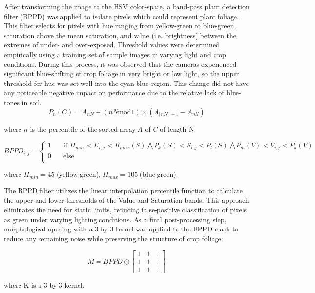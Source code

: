 \documentclass[authoryear]{elsarticle}
\begin{document}
After transforming the image to the HSV color-space, a band-pass plant
detection filter (BPPD) was applied to isolate pixels which could
represent plant foliage. This filter selects for pixels with hue
ranging from yellow-green to blue-green, saturation above the mean
saturation, and value (i.e. brightness) between the extremes of under-
and over-exposed. Threshold values were determined empirically using a
training set of sample images in varying light and crop
conditions. During this process, it was observed that the cameras
experienced significant blue-shifting of crop foliage in very bright
or low light, so the upper threshold for hue was set well into the
cyan-blue region. This change did not have any noticeable negative
impact on performance due to the relative lack of blue-tones in soil.
\begin{equation}
  P_{n}(C) = A_{nN} + (nN \text{mod} 1) \times (A_{\lfloor nN \rfloor + 1}-A_{nN})
  \label{eq:percentile}
\end{equation}
\begin{flushleft}
where $n$ is the percentile of the  sorted array $A$ of $C$ of length N.
\end{flushleft}

\begin{equation}
BPPD_{i,j} =
  \begin{cases}
    1  & \quad \text{if } H_{min}<H_{i,j}<H_{max}(S) \bigwedge P_{k}(S)< S_{i,j} <P_{l}(S) \bigwedge P_{m}(V)< V_{i,j}<P_{n}(V)\text{ }\\
    0  & \quad \text{else}\\
  \end{cases}
  \label{eq:bppd}
\end{equation}
\begin{flushleft}
where $H_{min}=45$ (yellow-green), $H_{max}=105$ (blue-green).
\end{flushleft}

The BPPD filter utilizes the linear interpolation percentile function
to calculate the upper and lower thresholds of the Value and
Saturation bands. This approach eliminates the need for static limits,
reducing false-positive classification of pixels as green under
varying lighting conditions. As a final post-processing step,
morphological opening with a 3 by 3 kernel was applied to the BPPD
mask to reduce any remaining noise while preserving the structure of
crop foliage:

\begin{equation}
M = BPPD \otimes
\begin{bmatrix}
       1 & 1 & 1 \\
       1 & 1 & 1 \\
       1 & 1 & 1
     \end{bmatrix}
\label{eq:morph_opening}
\end{equation}
\begin{flushleft}
where K is a 3 by 3 kernel.
\end{flushleft}
\end{document}
